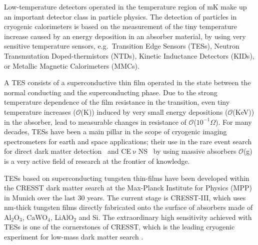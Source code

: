 \documentclass[superscriptaddress,nofootinbib ]{revtex4-2}
\begin{document}
Low-temperature detectors operated in the temperature region of \unit[10-100]{mK} make up an important detector class in particle physics. The detection of particles in cryogenic calorimeters is based on the measurement of the tiny temperature increase caused by an energy deposition in an absorber material,  by using very sensitive temperature sensors, e.g.~Transition Edge Sensors (TESs), Neutron Transmutation Doped-thermistors (NTDs), Kinetic Inductance Detectors (KIDs), or Metallic Magnetic Calorimeters (MMCs). 

A TES consists of a superconductive thin film operated in the state between the normal conducting and the superconducting phase. Due to the strong temperature dependence of the film resistance in the transition, even tiny temperature increases ($\mathcal{O}$(\textmu K)) induced by very small energy depositions ($\mathcal{O}$(KeV)) in the absorber, lead to  measurable changes in resistance of $\mathcal{O}$($10^{-1}\Omega$). For many decades, TESs have been a main pillar in the scope of cryogenic imaging spectrometers for earth and space applications; their use in the rare event search for direct dark matter detection~\cite{abdelhameed_first_2019,supercdms_collaboration_light_2021,supercdms_collaboration_search_2019,angloher_cosinus_2016} and CE$\upnu$NS~\cite{angloher_exploring_2019,billard_coherent_2017} by using massive absorbers $\mathcal{O}$(\unit[1-100]{g}) is a very active field of research at the frontier of knowledge.

TESs based on superconducting tungsten thin-films have been developed within the CRESST dark matter search at the Max-Planck Institute for Physics (MPP) in Munich over the last 30 years. The current stage is CRESST-III, which uses \unit[200]{nm}-thick tungsten films directly fabricated onto the surface of absorbers made of Al$_{2}$O$_{3}$, CaWO$_{4}$, LiAlO$_{2}$ and Si. The extraordinary high sensitivity achieved with TESs is one of the cornerstones of CRESST, which is the leading cryogenic experiment for low-mass dark matter search \cite{abdelhameed_first_2019, angloher_results_2017}.
\end{document}

